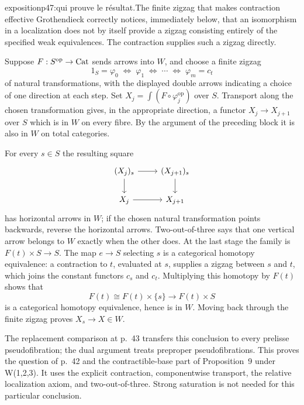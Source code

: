 \begin{dcomment}{exposition}{p47:qui prouve le résultat.}{The finite zigzag that makes contraction effective}
Grothendieck correctly notices, immediately below, that an isomorphism in a localization does not by itself provide a zigzag consisting entirely of the specified weak equivalences. The contraction supplies such a zigzag directly.

Suppose $F:S^{\mathrm{op}}\to\mathrm{Cat}$ sends arrows into $W$, and choose a finite zigzag
\[
 1_S=\varphi_0\;\Longleftrightarrow\;\varphi_1
 \;\Longleftrightarrow\;\cdots
 \;\Longleftrightarrow\;\varphi_m=c_t
\]
of natural transformations, with the displayed double arrows indicating a choice of one direction at each step. Set $X_j=\int(F\circ\varphi_j^{\mathrm{op}})$ over $S$. Transport along the chosen transformation gives, in the appropriate direction, a functor $X_j\to X_{j+1}$ over $S$ which is in $W$ on every fibre. By the argument of the preceding block it is also in $W$ on total categories.

For every $s\in S$ the resulting square
\[
\begin{tikzcd}
 (X_j)_s\arrow[r]\arrow[d] & (X_{j+1})_s\arrow[d]\\
 X_j\arrow[r] & X_{j+1}
\end{tikzcd}
\]
has horizontal arrows in $W$; if the chosen natural transformation points backwards, reverse the horizontal arrows. Two-out-of-three says that one vertical arrow belongs to $W$ exactly when the other does. At the last stage the family is $F(t)\times S\to S$. The map $e\to S$ selecting $s$ is a categorical homotopy equivalence: a contraction to $t$, evaluated at $s$, supplies a zigzag between $s$ and $t$, which joins the constant functors $c_s$ and $c_t$. Multiplying this homotopy by $F(t)$ shows that
\[
 F(t)\cong F(t)\times\{s\}\longrightarrow F(t)\times S
\]
is a categorical homotopy equivalence, hence is in $W$. Moving back through the finite zigzag proves $X_s\to X\in W$.

The replacement comparison at p.~43 transfers this conclusion to every prelisse pseudofibration; the dual argument treats preproper pseudofibrations. This proves the question of p.~42 and the contractible-base part of Proposition~9 under W(1,2,3). It uses the explicit contraction, componentwise transport, the relative localization axiom, and two-out-of-three. Strong saturation is not needed for this particular conclusion.
\end{dcomment}


